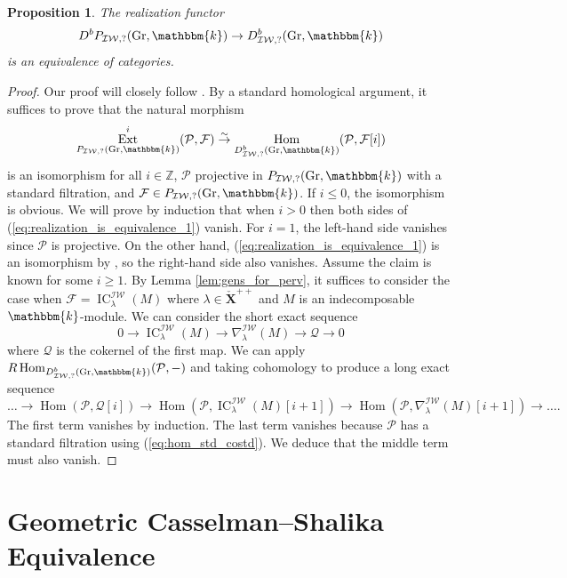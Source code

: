 \documentclass{amsart}
\newcommand{\Z}{\mathbb{Z}}
\renewcommand{\k}{\mathbbm{k}}
\newcommand{\scrF}{\mathcal{F}}
\newcommand{\scrP}{\mathcal{P}}
\newcommand{\bfXv}{\check{\mathbf{X}}}
\newcommand{\IW}{\mathcal{IW}}
\DeclareMathOperator{\Hom}{Hom}
\DeclareMathOperator{\Ext}{Ext}
\DeclareMathOperator{\IC}{IC}
\newcommand{\scrQ}{\mathcal{Q}}
\DeclareMathOperator{\Gr}{Gr}
\newtheorem{proposition}[subsubsection]{Proposition}
\theoremstyle{definition}
\begin{document}
    \begin{proposition}\label{prop:realization_is_equivalence}
        The realization functor
        \[D^b P_{\IW, ?} (\Gr, \k) \to D_{\IW, ?}^b (\Gr, \k)\]
        is an equivalence of categories.
    \end{proposition}
    \begin{proof}
        Our proof will closely follow \cite[Corollary 2.3.4]{RSW}. By a standard homological argument, it suffices to prove that the natural morphism
        \begin{equation}\label{eq:realization_is_equivalence_1}
            \Ext_{P_{\IW, ?} (\Gr, \k)}^i (\scrP, \scrF) \stackrel{\sim}{\to} \Hom_{D_{\IW, ?}^b (\Gr, \k)} (\scrP, \scrF [i])
        \end{equation}
        is an isomorphism for all $i \in \Z$, $\scrP$ projective in $P_{\IW, ?} (\Gr, \k)$ with a standard filtration, and $\scrF \in P_{\IW, ?} (\Gr, \k)$. 
        If $i \leq 0$, the isomorphism is obvious. We will prove by induction that when $i > 0$ then both sides of (\ref{eq:realization_is_equivalence_1}) vanish.
        For $i = 1$, the left-hand side vanishes since $\scrP$ is projective. On the other hand, (\ref{eq:realization_is_equivalence_1}) is an isomorphism by \cite[Remarque 3.1.17]{BBD}, so the right-hand side also vanishes.
        Assume the claim is known for some $i \geq 1$.
        By Lemma \ref{lem:gens_for_perv}, it suffices to consider the case when $\scrF = \IC_{\lambda}^{\IW} (M)$ where $\lambda \in \bfXv^{++}$ and $M$ is an indecomposable $\k$-module.
        We can consider the short exact sequence
        \[0 \to \IC_{\lambda}^{\IW} (M) \to \nabla_{\lambda}^{\IW} (M) \to \scrQ \to 0\]
        where $\scrQ$ is the cokernel of the first map. We can apply $R\Hom_{D_{\IW, ?}^b (\Gr, \k)} (\scrP, -)$ and taking cohomology to produce a long exact sequence
        \[\ldots \to \Hom (\scrP, \scrQ [i]) \to \Hom(\scrP, \IC_{\lambda}^{\IW} (M) [i+1]) \to \Hom (\scrP, \nabla_{\lambda}^{\IW} (M) [i+1]) \to \ldots.\]
        The first term vanishes by induction. The last term vanishes because $\scrP$ has a standard filtration using (\ref{eq:hom_std_costd}).
        We deduce that the middle term must also vanish.
    \end{proof}

    \section{Geometric Casselman--Shalika Equivalence}
    
\end{document}
